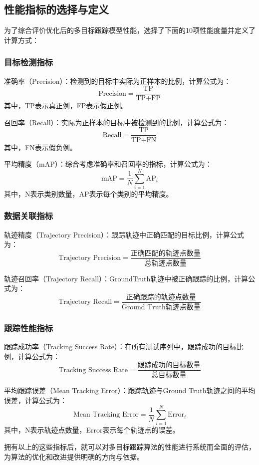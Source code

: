 \subsection{性能指标的选择与定义}

为了综合评价优化后的多目标跟踪模型性能，选择了下面的10项性能度量并定义了计算方式：

\subsubsection{目标检测指标}
准确率（Precision）：检测到的目标中实际为正样本的比例，计算公式为：
\[\text{Precision} = \frac{\text{TP}}{\text{TP} + \text{FP}}\]
其中，TP表示真正例，FP表示假正例。

召回率（Recall）：实际为正样本的目标中被检测到的比例，计算公式为：
\[\text{Recall} = \frac{\text{TP}}{\text{TP} + \text{FN}}\]
其中，FN表示假负例。

平均精度（mAP）：综合考虑准确率和召回率的指标，计算公式为：
\[\text{mAP} = \frac{1}{N} \sum_{i=1}^{N} \text{AP}_i\]
其中，N表示类别数量，AP表示每个类别的平均精度。

\subsubsection{数据关联指标}
轨迹精度（Trajectory Precision）：跟踪轨迹中正确匹配的目标比例，计算公式为：
\[\text{Trajectory Precision} = \frac{\text{正确匹配的轨迹点数量}}{\text{总轨迹点数量}}\]

轨迹召回率（Trajectory Recall）：GroundTruth轨迹中被正确跟踪的比例，计算公式为：
\[\text{Trajectory Recall} = \frac{\text{正确跟踪的轨迹点数量}}{\text{Ground Truth轨迹点数量}}\]

\subsubsection{跟踪性能指标}

跟踪成功率（Tracking Success Rate）：在所有测试序列中，跟踪成功的目标比例，计算公式为：
\[\text{Tracking Success Rate} = \frac{\text{跟踪成功的目标数量}}{\text{总目标数量}}\]

平均跟踪误差（Mean Tracking Error）：跟踪轨迹与Ground Truth轨迹之间的平均误差，计算公式为：
\[\text{Mean Tracking Error} = \frac{1}{N} \sum_{i=1}^{N} \text{Error}_i\]
其中，N表示轨迹点数量，Error表示每个轨迹点的误差。




拥有以上的这些指标后，就可以对多目标跟踪算法的性能进行系统而全面的评估，为算法的优化和改进提供明确的方向与依据。







